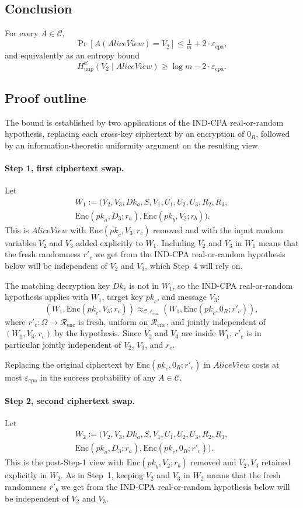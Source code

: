 \documentclass[11pt]{article}
\newcommand{\Renc}{\mathcal{R}_{\mathrm{enc}}}
\newcommand{\epscpa}{\varepsilon_{\mathrm{cpa}}}
\newcommand{\HunpC}{H_{\mathrm{unp}}^{\mathcal{C}}}
\newcommand{\C}{\mathcal{C}}
\newcommand{\Encf}{\mathrm{Enc}}
\newcommand{\AliceView}{\mathit{AliceView}}
\newcommand{\Dk}{\mathit{Dk}}
\newcommand{\pk}{\mathit{pk}}
\begin{document}
\subsection*{Conclusion}

For every $A \in \C$,
\[ \Pr[A(\AliceView) = V_2] \leq \tfrac{1}{m} + 2 \cdot \epscpa, \]
and equivalently as an entropy bound
\[ \HunpC(V_2 \mid \AliceView) \geq \log m - 2 \cdot \epscpa. \]

\subsection*{Proof outline}

The bound is established by two applications of the IND-CPA real-or-random hypothesis, replacing each cross-key ciphertext by an encryption of $0_R$, followed by an information-theoretic uniformity argument on the resulting view.

\paragraph{Step 1, first ciphertext swap.} Let
\begin{multline*}
W_1 := \big( V_2, V_3, \Dk_a, S, V_1, U_1, U_2, U_3, R_2, R_3, \\
\Encf(\pk_a, D_3; r_a), \Encf(\pk_b, V_2; r_b) \big).
\end{multline*}
This is $\AliceView$ with $\Encf(\pk_c, V_3; r_c)$ removed and with the input random variables $V_2$ and $V_3$ added explicitly to $W_1$. Including $V_2$ and $V_3$ in $W_1$ means that the fresh randomness $r'_c$ we get from the IND-CPA real-or-random hypothesis below will be independent of $V_2$ and $V_3$, which Step~4 will rely on.

The matching decryption key $\Dk_c$ is not in $W_1$, so the IND-CPA real-or-random hypothesis applies with $W_1$, target key $\pk_c$, and message $V_3$:
\[
(W_1, \Encf(\pk_c, V_3; r_c)) \approx_{\C, \epscpa} (W_1, \Encf(\pk_c, 0_R; r'_c)),
\]
where $r'_c : \Omega \to \Renc$ is fresh, uniform on $\Renc$, and jointly independent of $(W_1, V_3, r_c)$ by the hypothesis. Since $V_2$ and $V_3$ are inside $W_1$, $r'_c$ is in particular jointly independent of $V_2$, $V_3$, and $r_c$.

Replacing the original ciphertext by $\Encf(\pk_c, 0_R; r'_c)$ in $\AliceView$ costs at most $\epscpa$ in the success probability of any $A \in \C$.

\paragraph{Step 2, second ciphertext swap.} Let
\begin{multline*}
W_2 := \big( V_2, V_3, \Dk_a, S, V_1, U_1, U_2, U_3, R_2, R_3, \\
\Encf(\pk_a, D_3; r_a), \Encf(\pk_c, 0_R; r'_c) \big).
\end{multline*}
This is the post-Step-1 view with $\Encf(\pk_b, V_2; r_b)$ removed and $V_2, V_3$ retained explicitly in $W_2$. As in Step~1, keeping $V_2$ and $V_3$ in $W_2$ means that the fresh randomness $r'_b$ we get from the IND-CPA real-or-random hypothesis below will be independent of $V_2$ and $V_3$.
\end{document}
